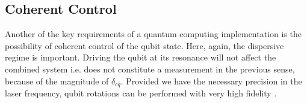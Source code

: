 \subsection{Coherent Control}
Another of the key requirements of a quantum computing implementation is the possibility of coherent control of the qubit state. 
Here, again, the dispersive regime is important. 
Driving the qubit at its resonance will not affect the combined system i.e. does not constitute a measurement in the previous sense, because of the magnitude of $\delta_{cq}$.
Provided we have the necessary precision in the laser frequency, qubit rotations can be performed with very high fidelity \cite{Blais2004a}.
